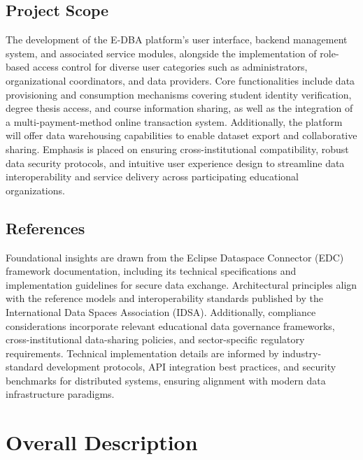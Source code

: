 \section{Project Scope}
The development of the E-DBA platform’s user interface, backend management system, and associated service modules, alongside the implementation of role-based access control for diverse user categories such as administrators, organizational coordinators, and data providers. Core functionalities include data provisioning and consumption mechanisms covering student identity verification, degree thesis access, and course information sharing, as well as the integration of a multi-payment-method online transaction system. Additionally, the platform will offer data warehousing capabilities to enable dataset export and collaborative sharing. Emphasis is placed on ensuring cross-institutional compatibility, robust data security protocols, and intuitive user experience design to streamline data interoperability and service delivery across participating educational organizations.

\section{References}
Foundational insights are drawn from the Eclipse Dataspace Connector (EDC) framework documentation, including its technical specifications and implementation guidelines for secure data exchange. Architectural principles align with the reference models and interoperability standards published by the International Data Spaces Association (IDSA). Additionally, compliance considerations incorporate relevant educational data governance frameworks, cross-institutional data-sharing policies, and sector-specific regulatory requirements. Technical implementation details are informed by industry-standard development protocols, API integration best practices, and security benchmarks for distributed systems, ensuring alignment with modern data infrastructure paradigms.


\chapter{Overall Description}

